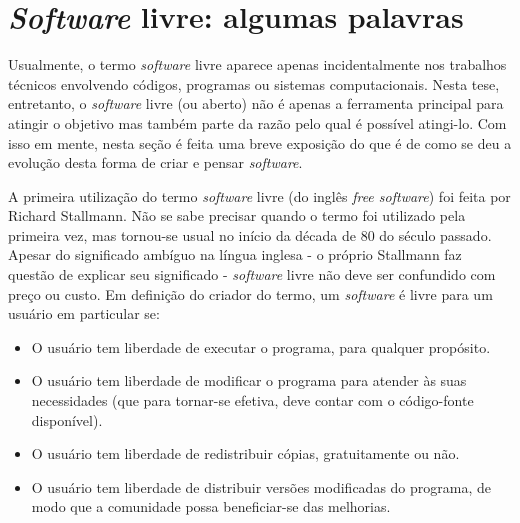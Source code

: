 



\section{\textit{Software} livre: algumas palavras}
\label{sec:intsl}

Usualmente, o termo \textit{software} livre aparece apenas incidentalmente nos trabalhos
técnicos envolvendo códigos, programas ou sistemas computacionais. Nesta tese, entretanto,
o \textit{software} livre (ou aberto) não é apenas a ferramenta principal para atingir o objetivo
mas também parte da razão pelo qual é possível atingi-lo. Com isso em mente, nesta seção é
feita uma breve exposição do que é de como se deu a evolução desta forma de criar e pensar
\textit{software}.

A primeira utilização do termo \textit{software} livre (do inglês \textit{free software})
foi feita por Richard Stallmann. Não se sabe precisar quando o termo foi utilizado pela
primeira vez, mas tornou-se usual no início da década de 80 do século passado.
Apesar do significado ambíguo na língua inglesa - o próprio Stallmann faz questão
de explicar seu significado \cite{Stallman2002} - \textit{software} livre não deve
ser confundido com preço ou custo. Em definição do criador do termo, um \textit{software}
é livre para um usuário em particular se:
\begin{itemize}
\item O usuário tem liberdade de executar o programa, para qualquer propósito.
\item O usuário tem liberdade de modificar o programa para atender às suas necessidades
  (que para tornar-se efetiva, deve contar com o código-fonte disponível).
\item O usuário tem liberdade de redistribuir cópias, gratuitamente ou não.
\item O usuário tem liberdade de distribuir versões modificadas do programa, de modo
  que a comunidade possa beneficiar-se das melhorias.
\end{itemize}

